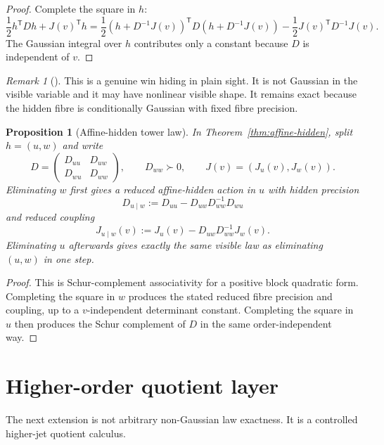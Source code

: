 \documentclass[11pt,a4paper]{article}
\numberwithin{equation}{section}
\theoremstyle{thmcompact}
\newtheorem{proposition}[theorem]{Proposition}
\theoremstyle{remark}
\newtheorem*{remarkplain}{Remark}
\newenvironment{remark}[1][]%
{\begin{remarkbox}\begin{remarkplain}[#1]\normalfont}
{\end{remarkplain}\end{remarkbox}}
\begin{document}
\begin{proof}
Complete the square in $h$:
\[
\frac12h^{\mathsf T}Dh+J(v)^{\mathsf T}h
=\frac12(h+D^{-1}J(v))^{\mathsf T}D(h+D^{-1}J(v))
-\frac12J(v)^{\mathsf T}D^{-1}J(v).
\]
The Gaussian integral over $h$ contributes only a constant because $D$ is independent of $v$.
\end{proof}

\begin{remark}
This is a genuine win hiding in plain sight. It is not Gaussian in the visible variable and it may have nonlinear visible shape. It remains exact because the hidden fibre is conditionally Gaussian with fixed fibre precision.
\end{remark}

\begin{proposition}[Affine-hidden tower law]
\label{prop:affine-hidden-tower}
In Theorem~\ref{thm:affine-hidden}, split $h=(u,w)$ and write
\[
D=
\begin{pmatrix}
D_{uu}&D_{uw}\\
D_{wu}&D_{ww}
\end{pmatrix},
\qquad D_{ww}\succ0,
\qquad J(v)=(J_u(v),J_w(v)).
\]
Eliminating $w$ first gives a reduced affine-hidden action in $u$ with hidden precision
\[
D_{u\mid w}:=D_{uu}-D_{uw}D_{ww}^{-1}D_{wu}
\]
and reduced coupling
\[
J_{u\mid w}(v):=J_u(v)-D_{uw}D_{ww}^{-1}J_w(v).
\]
Eliminating $u$ afterwards gives exactly the same visible law as eliminating $(u,w)$ in one step.
\end{proposition}

\begin{proof}
This is Schur-complement associativity for a positive block quadratic form. Completing the square in $w$ produces the stated reduced fibre precision and coupling, up to a $v$-independent determinant constant. Completing the square in $u$ then produces the Schur complement of $D$ in the same order-independent way.
\end{proof}

\section{Higher-order quotient layer}

The next extension is not arbitrary non-Gaussian law exactness. It is a controlled higher-jet quotient calculus.
\end{document}
